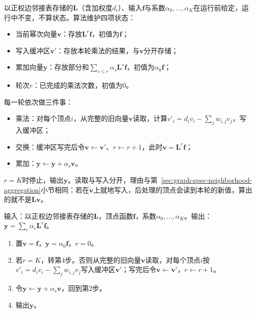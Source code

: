 以正权边邻接表存储的$\bm L$（含加权度$d_i$）、输入$\bm f$与系数$\alpha_0,\ldots,\alpha_K$在运行前给定，运行中不变，不算状态。算法维护四项状态：
\begin{itemize}
  \item 当前幂次向量$\bm v$：存放$\bm L^r\bm f$，初值为$\bm f$；
  \item 写入缓冲区$\bm v'$：存放本轮乘法的结果，与$\bm v$分开存储；
  \item 累加向量$\bm y$：存放部分和$\sum_{s\leq r}\alpha_s\bm L^s\bm f$，初值为$\alpha_0\bm f$；
  \item 轮次$r$：已完成的乘法次数，初值为$0$。
\end{itemize}
每一轮依次做三件事：
\begin{itemize}
  \item 乘法：对每个顶点$i$，从完整的旧向量$\bm v$读取，计算$v'_i=d_iv_i-\sum_jw_{i,j}v_j$，写入缓冲区；
  \item 交换：缓冲区写完后令$\bm v\gets\bm v'$、$r\gets r+1$，此时$\bm v=\bm L^r\bm f$；
  \item 累加：$\bm y\gets\bm y+\alpha_r\bm v$。
\end{itemize}
$r=K$时停止，输出$\bm y$。读取与写入分开，理由与第~\ref{sec:graph-spec-neighborhood-aggregation}小节相同：若在$\bm v$上就地写入，后处理的顶点会读到本轮的新值，算出的就不是$\bm L\bm v$。

\begin{algorithm}[多项式图滤波]
\label{alg:graph-spec-polynomial-filter}
输入：以正权边邻接表存储的$\bm L$，顶点函数$\bm f$，系数$\alpha_0,\ldots,\alpha_K$。输出：$\bm y=\sum_r\alpha_r\bm L^r\bm f$。
\begin{enumerate}
 \item 置$\bm v=\bm f$，$\bm y=\alpha_0\bm f$，$r=0$。
 \item 若$r=K$，转第4步。否则从完整的旧向量$\bm v$读取，对每个顶点$i$按$v'_i=d_iv_i-\sum_jw_{i,j}v_j$写入缓冲区$\bm v'$；写完后令$\bm v\gets\bm v'$，$r\gets r+1$。
 \item 令$\bm y\gets\bm y+\alpha_r\bm v$，回到第2步。
 \item 输出$\bm y$。
\end{enumerate}
\end{algorithm}

